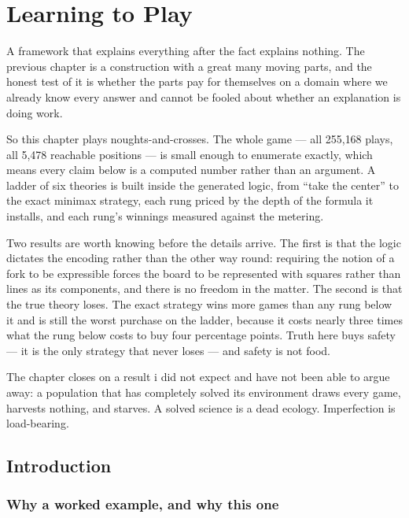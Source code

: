 \chapter{Learning to Play}
\label{ch:gam}

\noindent
A framework that explains everything after the fact explains nothing. The
previous chapter is a construction with a great many moving parts, and the
honest test of it is whether the parts pay for themselves on a domain where
we already know every answer and cannot be fooled about whether an
explanation is doing work.

So this chapter plays noughts-and-crosses. The whole game --- all 255{,}168
plays, all 5{,}478 reachable positions --- is small enough to enumerate
exactly, which means every claim below is a computed number rather than an
argument. A ladder of six theories is built inside the generated logic,
from ``take the center'' to the exact minimax strategy, each rung priced by
the depth of the formula it installs, and each rung's winnings measured
against the metering.

Two results are worth knowing before the details arrive. The first is that
the logic dictates the encoding rather than the other way round: requiring
the notion of a fork to be expressible forces the board to be represented
with squares rather than lines as its components, and there is no freedom
in the matter. The second is that the true theory loses. The exact strategy
wins more games than any rung below it and is still the worst purchase on
the ladder, because it costs nearly three times what the rung below costs to
buy four percentage points. Truth here buys safety --- it is the only
strategy that never loses --- and safety is not food.

The chapter closes on a result i did not expect and have not been able to
argue away: a population that has completely solved its environment draws
every game, harvests nothing, and starves. A solved science is a dead
ecology. Imperfection is load-bearing.

\bigskip

\section{Introduction}\label{gam:S1}

\subsection{Why a worked example, and why this one}\label{gam:S1.1}

